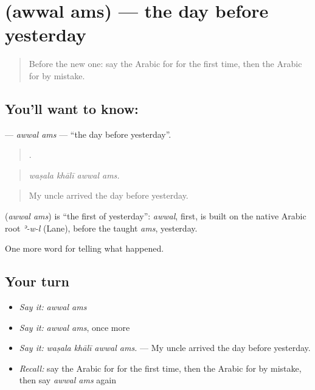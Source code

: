 \section[\texorpdfstring{\ar{أول} \ar{أمس} (awwal ams)}{أول أمس (awwal ams)}]{  (awwal ams) — the day before yesterday}

\label{lesson:AR-C349-awwal-ams}



\begin{quote}
Before the new one: say the Arabic for for the first time, then the Arabic for by mistake.
\end{quote}

\subsection*{You'll want to know:  }
\textbf{ } — \emph{awwal ams} — \textquotedblleft{}the day before yesterday\textquotedblright{}.

\begin{quote}
   .
\end{quote}

\begin{quote}
\emph{waṣala khālī awwal ams.}
\end{quote}

\begin{quote}
My uncle arrived the day before yesterday.
\end{quote}

\begin{cousinweb}
\textbf{ } (\emph{awwal ams}) is \textquotedblleft{}the first of yesterday\textquotedblright{}: \emph{awwal}, first, is built on the native Arabic root \emph{ʾ-w-l} (Lane), before the taught \emph{ams}, yesterday.
\end{cousinweb}

\begin{grammarlens}[title={What you've built}]
One more word for telling what happened.
\end{grammarlens}

\subsection*{Your turn}
\begin{itemize}
\raggedright
  \item \emph{Say it:} \emph{awwal ams}
  \item \emph{Say it:} \emph{awwal ams}, once more
  \item \emph{Say it:} \emph{waṣala khālī awwal ams.} — My uncle arrived the day before yesterday.
  \item \emph{Recall:} say the Arabic for for the first time, then the Arabic for by mistake, then say \emph{awwal ams} again
\end{itemize}

